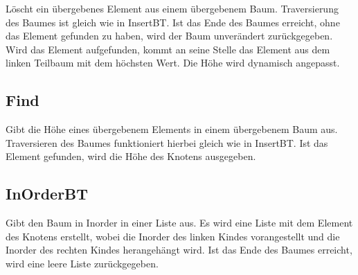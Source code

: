\documentclass[11pt]{article}
\begin{document}
    Löscht ein übergebenes Element aus einem übergebenem Baum. Traversierung des Baumes ist gleich wie in InsertBT. Ist das Ende des Baumes erreicht, ohne das Element gefunden zu haben, wird der Baum unverändert zurückgegeben. Wird das Element aufgefunden, kommt an seine Stelle das Element aus dem linken Teilbaum mit dem höchsten Wert. Die Höhe wird dynamisch angepasst.
    \subsection{Find}
    Gibt die Höhe eines übergebenem Elements in einem übergebenem Baum aus. Traversieren des Baumes funktioniert hierbei gleich wie in InsertBT. Ist das Element gefunden, wird die Höhe des Knotens ausgegeben.
    \subsection{InOrderBT}
    Gibt den Baum in Inorder in einer Liste aus. Es wird eine Liste mit dem Element des Knotens erstellt, wobei die Inorder des linken Kindes vorangestellt und die Inorder des rechten Kindes herangehängt wird. Ist das Ende des Baumes erreicht, wird eine leere Liste zurückgegeben.
\end{document}
